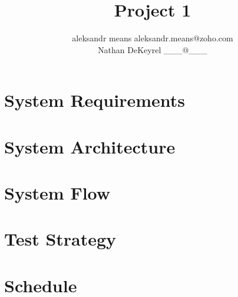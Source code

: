 \documentclass[twoside,11pt]{article}
\begin{document}
\title{Project 1}

\author{\name aleksandr means \email aleksandr.means@zoho.com \\
       \AND
       \name Nathan DeKeyrel \email \_\_\_@\_\_\_ \\}

\maketitle

\section{System Requirements}

\section{System Architecture}

\section{System Flow}

\section{Test Strategy}

\section{Schedule}
\end{document}
